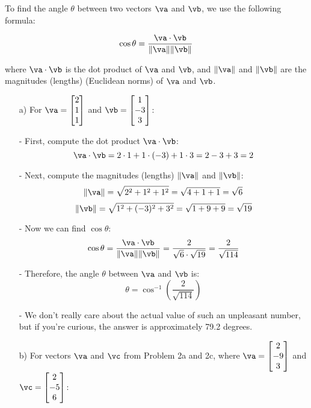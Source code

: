 \begin{sol}
    To find the angle $\theta$ between two vectors $\va$ and $\vb$, we use the following formula:

    \[
    \cos \theta = \frac{\va \cdot \vb}{\|\va\| \|\vb\|}
    \]

    where $\va \cdot \vb$ is the dot product of $\va$ and $\vb$, and $\|\va\|$ and $\|\vb\|$ are the magnitudes (lengths) (Euclidean norms) of $\va$ and $\vb$.

    \begin{enumerate}
        \item[a)] For $\va= \begin{bmatrix} 2 \\ 1 \\ 1 \end{bmatrix}$ and $\vb= \begin{bmatrix} 1 \\ -3 \\ 3 \end{bmatrix}$:

        - First, compute the dot product $\va \cdot \vb$:
          \[
          \va \cdot \vb = 2 \cdot 1 + 1 \cdot (-3) + 1 \cdot 3 = 2 - 3 + 3 = 2
          \]

        - Next, compute the magnitudes (lengths) $\|\va\|$ and $\|\vb\|$:
          \[
          \|\va\| = \sqrt{2^2 + 1^2 + 1^2} = \sqrt{4 + 1 + 1} = \sqrt{6}
          \]
          \[
          \|\vb\| = \sqrt{1^2 + (-3)^2 + 3^2} = \sqrt{1 + 9 + 9} = \sqrt{19}
          \]

        - Now we can find $\cos \theta$:
          \[
          \cos \theta = \frac{\va \cdot \vb}{\|\va\| \|\vb\|} = \frac{2}{\sqrt{6} \cdot \sqrt{19}} = \frac{2}{\sqrt{114}}
          \]

        - Therefore, the angle $\theta$ between $\va$ and $\vb$ is:
          \[
          \theta = \cos^{-1} \left( \frac{2}{\sqrt{114}} \right)
          \]

        - We don't really care about the actual value of such an unpleasant number, but if you're curious, the answer is approximately 79.2 degrees.

        \item[b)] For vectors $\va$ and $\vc$ from Problem 2a and 2c, where $\va= \begin{bmatrix} 2 \\ -9 \\ 3 \end{bmatrix}$ and $\vc = \begin{bmatrix} 2 \\ -5 \\ 6 \end{bmatrix}$:


\end{enumerate}
\end{sol}

